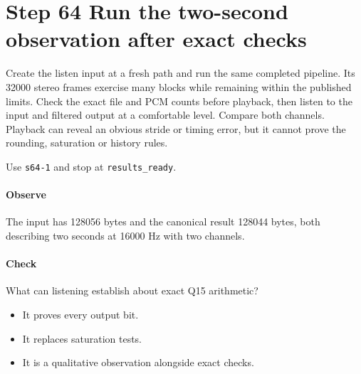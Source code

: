 \section{Step 64 Run the two-second observation after exact checks}\label{pcm-wav-s64}
Create the listen input at a fresh path and run the same completed pipeline. Its 32000 stereo frames exercise many blocks while remaining within the published limits. Check the exact file and PCM counts before playback, then listen to the input and filtered output at a comfortable level. Compare both channels. Playback can reveal an obvious stride or timing error, but it cannot prove the rounding, saturation or history rules.

Use \texttt{s64-1} and stop at \texttt{results\_ready}.

\paragraph{Observe} The input has 128056 bytes and the canonical result 128044 bytes, both describing two seconds at 16000 Hz with two channels.

\paragraph{Check} What can listening establish about exact Q15 arithmetic?
\begin{itemize}
\item[A.] It proves every output bit.
\item[B.] It replaces saturation tests.
\item[C.] It is a qualitative observation alongside exact checks.
\end{itemize}
